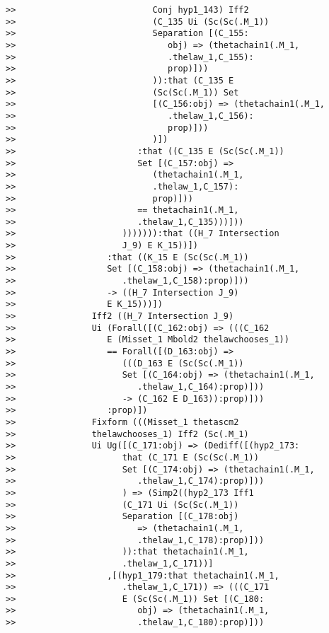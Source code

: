 \documentclass[12pt]{article}
\begin{document}
\begin{verbatim}
>>                           Conj hyp1_143) Iff2
>>                           (C_135 Ui (Sc(Sc(.M_1))
>>                           Separation [(C_155:
>>                              obj) => (thetachain1(.M_1,
>>                              .thelaw_1,C_155):
>>                              prop)]))
>>                           )):that (C_135 E
>>                           (Sc(Sc(.M_1)) Set
>>                           [(C_156:obj) => (thetachain1(.M_1,
>>                              .thelaw_1,C_156):
>>                              prop)]))
>>                           )])
>>                        :that ((C_135 E (Sc(Sc(.M_1))
>>                        Set [(C_157:obj) =>
>>                           (thetachain1(.M_1,
>>                           .thelaw_1,C_157):
>>                           prop)]))
>>                        == thetachain1(.M_1,
>>                        .thelaw_1,C_135)))]))
>>                     ))))))):that ((H_7 Intersection
>>                     J_9) E K_15))])
>>                  :that ((K_15 E (Sc(Sc(.M_1))
>>                  Set [(C_158:obj) => (thetachain1(.M_1,
>>                     .thelaw_1,C_158):prop)]))
>>                  -> ((H_7 Intersection J_9)
>>                  E K_15)))])
>>               Iff2 ((H_7 Intersection J_9)
>>               Ui (Forall([(C_162:obj) => (((C_162
>>                  E (Misset_1 Mbold2 thelawchooses_1))
>>                  == Forall([(D_163:obj) =>
>>                     (((D_163 E (Sc(Sc(.M_1))
>>                     Set [(C_164:obj) => (thetachain1(.M_1,
>>                        .thelaw_1,C_164):prop)]))
>>                     -> (C_162 E D_163)):prop)]))
>>                  :prop)])
>>               Fixform (((Misset_1 thetascm2
>>               thelawchooses_1) Iff2 (Sc(.M_1)
>>               Ui Ug([(C_171:obj) => (Dediff([(hyp2_173:
>>                     that (C_171 E (Sc(Sc(.M_1))
>>                     Set [(C_174:obj) => (thetachain1(.M_1,
>>                        .thelaw_1,C_174):prop)]))
>>                     ) => (Simp2((hyp2_173 Iff1
>>                     (C_171 Ui (Sc(Sc(.M_1))
>>                     Separation [(C_178:obj)
>>                        => (thetachain1(.M_1,
>>                        .thelaw_1,C_178):prop)]))
>>                     )):that thetachain1(.M_1,
>>                     .thelaw_1,C_171))]
>>                  ,[(hyp1_179:that thetachain1(.M_1,
>>                     .thelaw_1,C_171)) => (((C_171
>>                     E (Sc(Sc(.M_1)) Set [(C_180:
>>                        obj) => (thetachain1(.M_1,
>>                        .thelaw_1,C_180):prop)]))

\end{verbatim}
\end{document}
